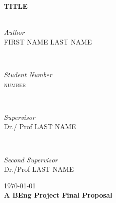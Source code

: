 \begin{titlepage}
	{\huge\bfseries TITLE}\\[0.4cm] %
	
	\HRule\\[1.5cm]
	
	
	\begin{minipage}{0.4\textwidth}
		\begin{flushleft}
			\large
			\textit{Author}\\
			FIRST NAME \textsc{LAST NAME} %
		\end{flushleft}
		  \hfill		
	\end{minipage}
         ~
	\begin{minipage}{0.4\textwidth}
		\begin{flushright}
			\large
			\textit{Student Number}\\
			 \textsc{number} %
		\end{flushright}
	\end{minipage}
	~
	\begin{minipage}{0.4\textwidth}
		\begin{flushleft}
			\large
			\textit{Supervisor}\\
			Dr./ Prof \textsc{LAST NAME} %
		\end{flushleft}
	\end{minipage}
	~
	\begin{minipage}{0.4\textwidth}
		\begin{flushright}
			\large
			\textit{Second Supervisor}\\
			Dr./Prof  \textsc{LAST NAME} %
		\end{flushright}
	\end{minipage}
	
	
	\vfill\vfill\vfill %
	
	{\large\today} \\%
	{\large \textbf{A BEng Project Final Proposal}}
	
	 
	
	\vfill %
	
\end{titlepage}

